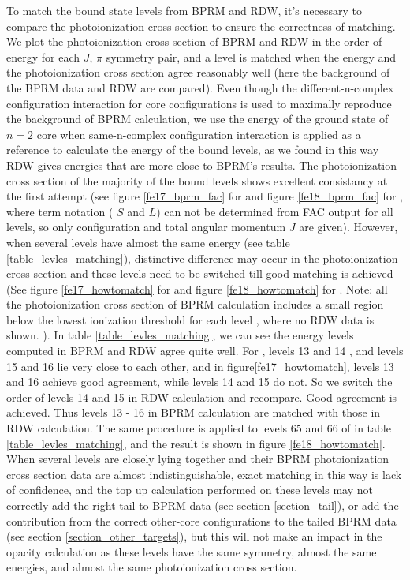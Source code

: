 To match the bound state levels from BPRM and RDW, it's necessary to compare the photoionization cross section to ensure the correctness of matching. We plot the photoionization cross section of BPRM and RDW in the order of energy for each $J$, $\pi$ symmetry pair, and a level is matched when the energy and the photoionization cross section agree reasonably well (here the background of the BPRM data and RDW are compared). Even though the different-n-complex configuration interaction for core configurations is used to maximally reproduce the background of BPRM calculation, we use the energy of the ground state of $n=2$ core when same-n-complex configuration interaction is applied as a reference to calculate the energy of the bound levels, as we found in this way RDW gives energies that are more close to BPRM's results. The photoionization cross section of the majority of the bound levels shows excellent consistancy at the first attempt (see figure \ref{fe17_bprm_fac} for  and figure \ref{fe18_bprm_fac} for , where term notation ( $S$ and $L$) can not be determined from FAC output for all levels, so only configuration and total angular momentum $J$ are given). However, when several levels have almost the same energy (see table \ref{table_levles_matching}), distinctive difference may occur in the photoionization cross section and these levels need to be switched till good matching is achieved  (See figure \ref{fe17_howtomatch} for  and figure \ref{fe18_howtomatch} for . Note: all the photoionization cross section of BPRM calculation includes a small region below the lowest ionization threshold for each level \citep{opcd_4}, where no RDW data is shown. ). In table \ref{table_levles_matching}, we can see the energy levels computed in BPRM and RDW agree quite well. For , levels 13 and 14 , and levels 15 and 16 lie very close to each other, and in figure\ref{fe17_howtomatch}, levels 13 and 16 achieve good agreement, while levels 14 and 15 do not. So we switch the order of levels 14 and 15 in RDW calculation and recompare. Good agreement is achieved. Thus levels 13 - 16 in BPRM calculation are matched with those in RDW calculation. The same procedure is applied to levels 65 and 66 of  in table \ref{table_levles_matching}, and the result is shown in figure \ref{fe18_howtomatch}. When several levels are closely lying together and their BPRM photoionization cross section data are almost indistinguishable, exact matching in this way is lack of confidence, and the top up calculation performed on these levels may not correctly add the right tail to BPRM data (see section \ref{section_tail}), or add the contribution from the correct other-core configurations to the tailed BPRM data (see section \ref{section_other_targets}), but this will not make an impact in the opacity calculation as these levels have the same symmetry, almost the same energies, and almost the same photoionization cross section.

